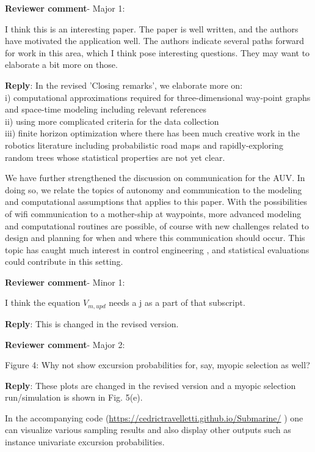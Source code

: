 \documentclass[a4paper]{article}
\def\revcom{\textbf{Reviewer comment}}
\def\reply{\textbf{Reply}}
\begin{document}
\begin{answers}

\item{\revcom - Major 1:}\label{r3c1}

I think this is an interesting paper. The paper is well written, 
and the authors have motivated the application well. 
The authors indicate several paths forward for work in this area, which I think pose interesting questions. They may want to elaborate a bit more on those.

\reply: In the revised 'Closing remarks', we elaborate more on: \\
i) computational approximations required for three-dimensional way-point graphs and space-time modeling including relevant references \citep{sigrist2015stochastic,richardson2017sparsity} \\ 
ii) using more complicated criteria for the data collection \\
iii)
finite horizon optimization where there has been much creative work in the robotics literature including probabilistic road maps and rapidly-exploring random trees \citep{karaman2011sampling} whose statistical properties are not yet clear.

We have further strengthened the discussion on communication for the AUV. In doing so, we relate the topics of autonomy and communication to the modeling and computational assumptions that applies to this paper. With the possibilities of wifi communication to a mother-ship at waypoints, more advanced modeling and computational routines are possible, of course with new challenges related to design and planning for when and where this communication should occur. This topic has caught much interest in control engineering \citep{zolich2019survey}, and statistical evaluations could contribute in this setting.

\item{\revcom - Minor 1:}\label{r3c2}

I think the equation $V_{m,upd}$ needs a j as a part of that subscript.

\reply: This is changed in the revised version.

\item{\revcom - Major 2:}\label{r3c3}

Figure 4: Why not show excursion probabilities for, say, myopic selection as well?

\reply: These plots are changed in the revised version and a myopic selection run/simulation is shown in Fig. 5(e).  

In the accompanying code (\url{https://cedrictravelletti.github.io/Submarine/} )
one can visualize various sampling results and also display other outputs such as instance univariate excursion probabilities.

\end{answers}


\footnotesize



\end{document}
